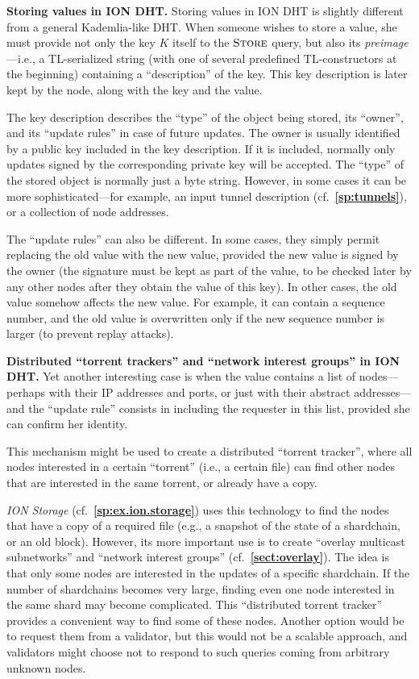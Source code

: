 \documentclass[12pt,oneside]{article}
\def\makepoint#1{\medbreak\noindent{\bf #1.\ }}
\def\nxsubpoint{\refstepcounter{subsubsection}%
  \smallbreak\makepoint{\thesubsubsection}}
\def\refpoint#1{{\rm\textbf{\ref{#1}}}}
\let\ptref=\refpoint
\def\embt(#1.){\textbf{#1.}}
\def\opsc#1{\operatorname{\textsc{#1}}}
\def\Store{\opsc{Store}}
\begin{document}
\nxsubpoint\label{sp:DHT.store} \embt(Storing values in ION DHT.)
Storing values in ION DHT is slightly different from a general
Kademlia-like DHT. When someone wishes to store a value, she must
provide not only the key $K$ itself to the $\Store$ query, but also
its {\em preimage\/}---i.e., a TL-serialized string (with one of
several predefined TL-constructors at the beginning) containing a
``description'' of the key. This key description is later kept by the
node, along with the key and the value.

The key description describes the ``type'' of the object being stored,
its ``owner'', and its ``update rules'' in case of future updates. The
owner is usually identified by a public key included in the key
description. If it is included, normally only updates signed by the
corresponding private key will be accepted. The ``type'' of the stored
object is normally just a byte string. However, in some cases it can
be more sophisticated---for example, an input tunnel description
(cf.~\ptref{sp:tunnels}), or a collection of node addresses.

The ``update rules'' can also be different. In some cases, they simply
permit replacing the old value with the new value, provided the new
value is signed by the owner (the signature must be kept as part of
the value, to be checked later by any other nodes after they obtain
the value of this key). In other cases, the old value somehow affects
the new value. For example, it can contain a sequence number, and the
old value is overwritten only if the new sequence number is larger (to
prevent replay attacks).

\nxsubpoint\label{sp:distr.torr.tr} \embt(Distributed ``torrent
trackers'' and ``network interest groups'' in ION DHT.)  Yet another
interesting case is when the value contains a list of nodes---perhaps
with their IP addresses and ports, or just with their abstract
addresses---and the ``update rule'' consists in including the
requester in this list, provided she can confirm her identity.

This mechanism might be used to create a distributed ``torrent
tracker'', where all nodes interested in a certain ``torrent'' (i.e.,
a certain file) can find other nodes that are interested in the same
torrent, or already have a copy.

{\em ION Storage\/} (cf.~\ptref{sp:ex.ion.storage}) uses this
technology to find the nodes that have a copy of a required file
(e.g., a snapshot of the state of a shardchain, or an old
block). However, its more important use is to create ``overlay
multicast subnetworks'' and ``network interest groups''
(cf.~\ptref{sect:overlay}). The idea is that only some nodes are
interested in the updates of a specific shardchain. If the number of
shardchains becomes very large, finding even one node interested in
the same shard may become complicated. This ``distributed torrent
tracker'' provides a convenient way to find some of these
nodes. Another option would be to request them from a validator, but
this would not be a scalable approach, and validators might choose not
to respond to such queries coming from arbitrary unknown nodes.
\end{document}
